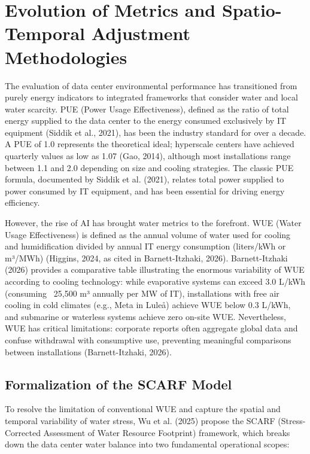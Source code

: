 \documentclass[conference]{IEEEtran}
\begin{document}
\section{Evolution of Metrics and Spatio-Temporal Adjustment Methodologies}

The evaluation of data center environmental performance has transitioned from purely energy indicators to integrated frameworks that consider water and local water scarcity. PUE (Power Usage Effectiveness), defined as the ratio of total energy supplied to the data center to the energy consumed exclusively by IT equipment (Siddik et al., 2021), has been the industry standard for over a decade. A PUE of 1.0 represents the theoretical ideal; hyperscale centers have achieved quarterly values as low as 1.07 (Gao, 2014), although most installations range between 1.1 and 2.0 depending on size and cooling strategies. The classic PUE formula, documented by Siddik et al. (2021), relates total power supplied to power consumed by IT equipment, and has been essential for driving energy efficiency.

However, the rise of AI has brought water metrics to the forefront. WUE (Water Usage Effectiveness) is defined as the annual volume of water used for cooling and humidification divided by annual IT energy consumption (liters/kWh or m³/MWh) (Higgins, 2024, as cited in Barnett-Itzhaki, 2026). Barnett-Itzhaki (2026) provides a comparative table illustrating the enormous variability of WUE according to cooling technology: while evaporative systems can exceed 3.0 L/kWh (consuming ~25,500 m³ annually per MW of IT), installations with free air cooling in cold climates (e.g., Meta in Luleå) achieve WUE below 0.3 L/kWh, and submarine or waterless systems achieve zero on-site WUE. Nevertheless, WUE has critical limitations: corporate reports often aggregate global data and confuse withdrawal with consumptive use, preventing meaningful comparisons between installations (Barnett-Itzhaki, 2026).

\subsection{Formalization of the SCARF Model}

To resolve the limitation of conventional WUE and capture the spatial and temporal variability of water stress, Wu et al. (2025) propose the SCARF (Stress-Corrected Assessment of Water Resource Footprint) framework, which breaks down the data center water balance into two fundamental operational scopes:
\end{document}

